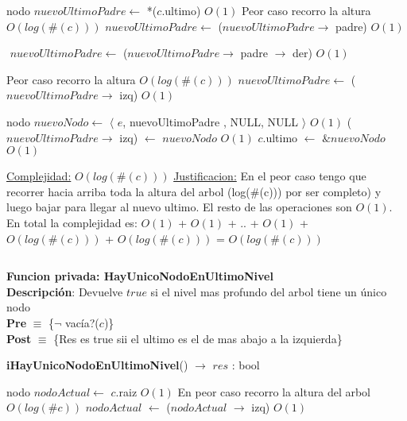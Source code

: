 \begin{Algoritmos}
\begin{algorithm}[H]
\begin{algorithmic}[1]
    \State nodo $nuevoUltimoPadre  \gets$ *($c$.ultimo) \Comment $O(1)$
      \Comment Peor caso recorro la altura $O(log(\#(c)))$
        \State $nuevoUltimoPadre  \gets$ ($nuevoUltimoPadre  \to$ padre) \Comment $O(1)$
    \EndWhile
    
    \State $ $
    \State $nuevoUltimoPadre  \gets$ ($nuevoUltimoPadre  \to$ padre $\to$ der) \Comment $O(1)$
    \State $ $
    
     \Comment Peor caso recorro la altura $O(log(\#(c)))$
        \State $nuevoUltimoPadre  \gets$ ($nuevoUltimoPadre  \to$ izq) \Comment $O(1)$
    \EndWhile
    \State $ $

    \State nodo $nuevoNodo \gets$ $\langle$ $e$, nuevoUltimoPadre , NULL, NULL $\rangle$ \Comment $O(1)$
    \State ($nuevoUltimoPadre  \to$ izq) $\gets$ $nuevoNodo$ \Comment $O(1)$
    \State $c$.ultimo $\gets$ $\&nuevoNodo$ \Comment $O(1)$

    \medskip
    \Statex \underline{Complejidad:} $O(log(\#(c)))$
    \Statex \underline{Justificacion:} En el peor caso tengo que recorrer hacia arriba toda la altura del arbol (log($\#$(c))) por ser completo) y luego bajar para llegar al nuevo ultimo. El resto de las operaciones son $O(1)$. En total la complejidad es: $O(1)$ + $O(1)$ + .. + $O(1)$ + $O(log(\#(c)))$ + $O(log(\#(c)))$ = $O(log(\#(c)))$
\end{algorithmic}
\end{algorithm}

$ $\newline



\textbf{Funcion privada: HayUnicoNodoEnUltimoNivel}\\
\textbf{Descripci\'on}: Devuelve $true$ si el nivel mas profundo del arbol tiene un \'unico nodo\\
\textbf{Pre} $\equiv$ \{$\neg$ vac\'ia?($c$)\}\\%
\textbf{Post} $\equiv$ \{Res es true sii el ultimo es el de mas abajo a la izquierda\}%
\begin{algorithm}[H]
{\textbf{iHayUnicoNodoEnUltimoNivel}() $\to$ $res$ : bool}
\begin{algorithmic}[1]

    \State nodo $nodoActual \gets$ $c$.raiz \Comment $O(1)$
     \Comment En peor caso recorro la altura del arbol $O(log(\#c))$
        \State $nodoActual$ $\gets$ ($nodoActual$ $\rightarrow$ izq) \Comment $O(1)$
    \EndWhile


\end{algorithmic}
\end{algorithm}
\end{Algoritmos}
